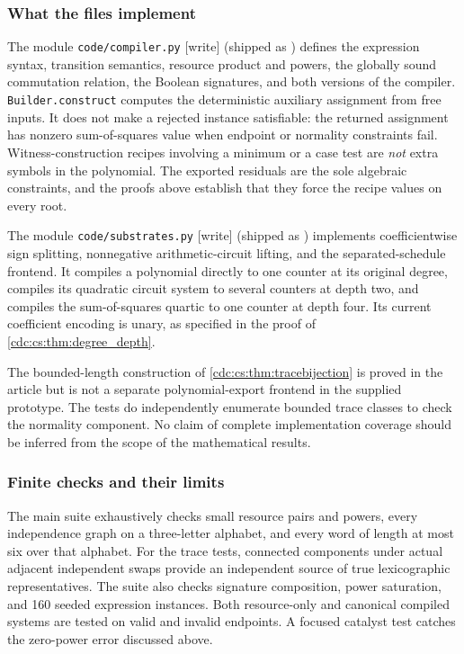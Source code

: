 \documentclass[11pt,a4paper]{article}
\theoremstyle{definition}
\theoremstyle{remark}
\newcommand{\kw}[1]{\texttt{#1}}
\newcommand{\wtag}{\textup{[write]}}%
\begin{document}
\subsubsection{What the files implement}

The module \kw{code/compiler.py} \wtag{} (shipped as ) defines the expression syntax, transition
semantics, resource product and powers, the globally sound commutation
relation, the Boolean signatures, and both versions of the compiler.
\kw{Builder.construct} computes the deterministic auxiliary assignment from
free inputs. It does not make a rejected instance satisfiable: the returned
assignment has nonzero sum-of-squares value when endpoint or normality
constraints fail. Witness-construction recipes involving a minimum or a case
test are \emph{not} extra symbols in the polynomial. The exported residuals
are the sole algebraic constraints, and the proofs above establish that they
force the recipe values on every root.

The module \kw{code/substrates.py} \wtag{} (shipped as ) implements coefficientwise sign splitting,
nonnegative arithmetic-circuit lifting, and the separated-schedule frontend.
It compiles a polynomial directly to one counter at its original degree,
compiles its quadratic circuit system to several counters at depth two, and
compiles the sum-of-squares quartic to one counter at depth four. Its current
coefficient encoding is unary, as specified in the proof of
\cref{cdc:cs:thm:degree_depth}.

The bounded-length construction of \cref{cdc:cs:thm:tracebijection} is proved in the
article but is not a separate polynomial-export frontend in the supplied
prototype. The tests do independently enumerate bounded trace classes to
check the normality component. No claim of complete implementation coverage
should be inferred from the scope of the mathematical results.

\subsubsection{Finite checks and their limits}

The main suite exhaustively checks small resource pairs and powers, every
independence graph on a three-letter alphabet, and every word of length at
most six over that alphabet. For the trace tests, connected components under
actual adjacent independent swaps provide an independent source of true
lexicographic representatives. The suite also checks signature composition,
power saturation, and 160 seeded expression instances. Both resource-only
and canonical compiled systems are tested on valid and invalid endpoints.
A focused catalyst test catches the zero-power error discussed above.
\end{document}
